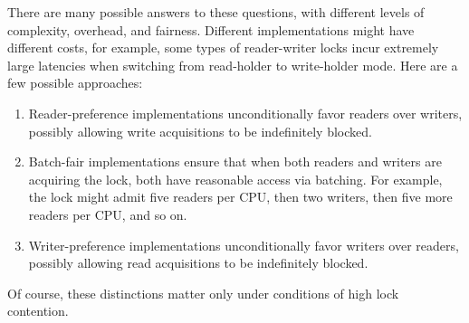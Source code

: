 There are many possible answers to these questions, with different
levels of complexity, overhead, and fairness.
Different implementations might have different costs, for example,
some types of reader-writer locks incur extremely large latencies
when switching from read-holder to write-holder mode.
Here are a few possible approaches:

\begin{enumerate}
\item	
	Reader-preference implementations unconditionally favor readers
	over writers, possibly allowing write acquisitions to be
	indefinitely blocked.
\item	Batch-fair implementations ensure that when both readers and writers
	are acquiring the lock, both have reasonable access via batching.
	For example, the lock might admit five readers per CPU, then two
	writers, then five more readers per CPU, and so on.
\item	Writer-preference implementations unconditionally favor
	writers over readers, possibly allowing read acquisitions to be
	indefinitely blocked.
\end{enumerate}

Of course, these distinctions matter only under conditions of high
lock contention.

